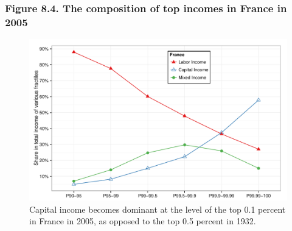 \documentclass[t]{beamer}\usepackage[]{graphicx}\usepackage[]{color}
\newenvironment{knitrout}{}{} %
\begin{document}
\begin{frame}[label=Figure_8_4,fragile]
\frametitle{Figure 8.4. The composition of top incomes in France in 2005}
\begin{figure}[t]
\begin{minipage}[b]{\textwidth}
\centering
\begin{knitrout}\footnotesize
{}\color{fgcolor}

{\centering \includegraphics[width=1\linewidth]{figures/color/Figure_8_4} 

}



\end{knitrout}
\caption{Capital income becomes dominant at the level of the top 0.1 percent in France in 2005, as opposed to the top 0.5 percent in 1932.}
\end{minipage}
\end{figure}
\end{frame}
\end{document}
